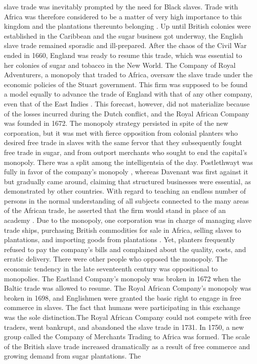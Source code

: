 slave trade was inevitably prompted by the need for Black slaves. Trade with Africa was therefore considered to be a matter of very high importance to this kingdom and the plantations thereunto belonging . Up until British colonies were established in the Caribbean and the sugar business got underway, the English slave trade remained sporadic and ill-prepared. After the chaos of the Civil War ended in 1660, England was ready to resume this trade, which was essential to her colonies of sugar and tobacco in the New World. The Company of Royal Adventurers, a monopoly that traded to Africa, oversaw the slave trade under the economic policies of the Stuart government. This firm was supposed to be found a model equally to advance the trade of England with that of any other company, even that of the East Indies . This forecast, however, did not materialize because of the losses incurred during the Dutch conflict, and the Royal African Company was founded in 1672. The monopoly strategy persisted in spite of the new corporation, but it was met with fierce opposition from colonial planters who desired free trade in slaves with the same fervor that they subsequently fought free trade in sugar, and from outport merchants who sought to end the capital's monopoly. There was a split among the intelligentsia of the day. Postlethwayt was fully in favor of the company's monopoly , whereas Davenant was first against it  but gradually came around, claiming that structured businesses were essential, as demonstrated by other countries. With regard to teaching an endless number of persons in the normal understanding of all subjects connected to the many areas of the African trade, he asserted that the firm would stand in place of an academy . Due to the monopoly, one corporation was in charge of managing slave trade ships, purchasing British commodities for sale in Africa, selling slaves to plantations, and importing goods from plantations . Yet, planters frequently refused to pay the company's bills and complained about the quality, costs, and erratic delivery.  There were other people who opposed the monopoly. The economic tendency in the late seventeenth century was oppositional to monopolies. The Eastland Company's monopoly was broken in 1672 when the Baltic trade was allowed to resume. The Royal African Company's monopoly was broken in 1698, and Englishmen were granted the basic right to engage in free commerce in slaves. The fact that humans were participating in this exchange was the sole distinction.The Royal African Company could not compete with free traders, went bankrupt, and abandoned the slave trade in 1731. In 1750, a new group called the Company of Merchants Trading to Africa was formed. The scale of the British slave trade increased dramatically as a result of free commerce and growing demand from sugar plantations. The 